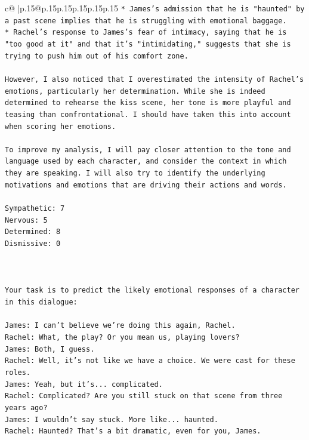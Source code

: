 \documentclass{article}
\begin{document}
{\begin{supertabular}{c@{$\;$}|p{.15\linewidth}@{}p{.15\linewidth}p{.15\linewidth}p{.15\linewidth}p{.15\linewidth}p{.15\linewidth}}
{{{\texttt{* James's admission that he is "haunted" by a past scene implies that he is struggling with emotional baggage.} \\
\texttt{* Rachel's response to James's fear of intimacy, saying that he is "too good at it" and that it's "intimidating," suggests that she is trying to push him out of his comfort zone.} \\
\\ 
\texttt{However, I also noticed that I overestimated the intensity of Rachel's emotions, particularly her determination. While she is indeed determined to rehearse the kiss scene, her tone is more playful and teasing than confrontational. I should have taken this into account when scoring her emotions.} \\
\\ 
\texttt{To improve my analysis, I will pay closer attention to the tone and language used by each character, and consider the context in which they are speaking. I will also try to identify the underlying motivations and emotions that are driving their actions and words.} \\
\\ 
\texttt{Sympathetic: 7} \\
\texttt{Nervous: 5} \\
\texttt{Determined: 8} \\
\texttt{Dismissive: 0} \\
\\ 
\\ 
\\ 
\texttt{Your task is to predict the likely emotional responses of a character in this dialogue:} \\
\\ 
\texttt{James: I can't believe we're doing this again, Rachel. } \\
\texttt{Rachel: What, the play? Or you mean us, playing lovers?} \\
\texttt{James: Both, I guess. } \\
\texttt{Rachel: Well, it's not like we have a choice. We were cast for these roles. } \\
\texttt{James: Yeah, but it's... complicated.} \\
\texttt{Rachel: Complicated? Are you still stuck on that scene from three years ago?} \\
\texttt{James: I wouldn't say stuck. More like... haunted.} \\
\texttt{Rachel: Haunted? That's a bit dramatic, even for you, James.} \\
}}}
\end{supertabular}}
\end{document}
